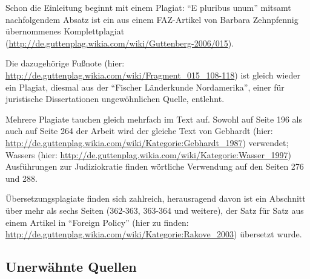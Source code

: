 \documentclass[ngerman,final,fontsize=12pt,paper=a4,twoside,BCOR=8mm,draft=false]{scrartcl}
\begin{document}
Schon die Einleitung beginnt mit einem Plagiat: "`E pluribus unum"' mitsamt nachfolgendem Absatz ist ein aus einem FAZ-Artikel von Barbara Zehnpfennig übernommenes Komplettplagiat (\url{http://de.guttenplag.wikia.com/wiki/Guttenberg-2006/015}). 

Die dazugehörige Fußnote (hier: \url{http://de.guttenplag.wikia.com/wiki/Fragment\_015\_108-118}) ist gleich wieder ein Plagiat, diesmal aus der "`Fischer Länderkunde Nordamerika"', einer für juristische Dissertationen ungewöhnlichen Quelle, entlehnt. 

Mehrere Plagiate tauchen gleich mehrfach im Text auf. Sowohl auf Seite
196 als auch auf Seite 264 der Arbeit wird der gleiche Text von
Gebhardt (hier:
\url{http://de.guttenplag.wikia.com/wiki/Kategorie:Gebhardt\_1987})
verwendet; Wassers (hier: \url{http://de.guttenplag.wikia.com/wiki/Kategorie:Wasser\_1997})
Ausführungen zur Judiziokratie finden wörtliche Verwendung auf den
Seiten 276 und 288.

Übersetzungsplagiate finden sich zahlreich, herausragend davon ist ein Abschnitt über mehr als sechs Seiten (362-363, 363-364 und weitere), der Satz für Satz aus einem Artikel in "`Foreign Policy"' (hier zu finden: \url{http://de.guttenplag.wikia.com/wiki/Kategorie:Rakove\_2003}) übersetzt wurde.

\subsection{Unerwähnte Quellen}
\end{document}

